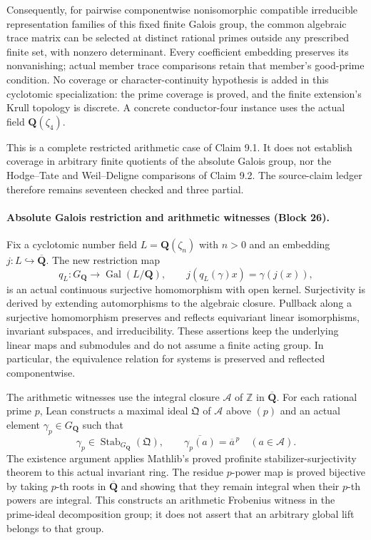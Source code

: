 \documentclass[11pt]{article}
\theoremstyle{definition}
\theoremstyle{remark}
\newcommand{\Q}{\mathbf Q}
\begin{document}
Consequently, for pairwise componentwise nonisomorphic compatible irreducible
representation families of this fixed finite Galois group, the common algebraic
trace matrix can be selected at distinct rational primes outside any prescribed
finite set, with nonzero determinant. Every coefficient embedding preserves its
nonvanishing; actual member trace comparisons retain that member's good-prime
condition. No coverage or character-continuity hypothesis is added in this
cyclotomic specialization: the prime coverage is proved, and the finite
extension's Krull topology is discrete. A concrete conductor-four instance uses
the actual field $\Q(\zeta_4)$.

This is a complete restricted arithmetic case of Claim 9.1. It does not establish
coverage in arbitrary finite quotients of the absolute Galois group, nor the
Hodge--Tate and Weil--Deligne comparisons of Claim 9.2. The source-claim ledger
therefore remains seventeen checked and three partial.

\paragraph{Absolute Galois restriction and arithmetic witnesses (Block 26).}
Fix a cyclotomic number field $L=\Q(\zeta_n)$ with $n>0$ and an embedding
$j:L\hookrightarrow\overline{\Q}$. The new restriction map
\[
 q_L:G_{\Q}\longrightarrow\operatorname{Gal}(L/\Q),\qquad
 j(q_L(\gamma)x)=\gamma(j(x)),
\]
is an actual continuous surjective homomorphism with open kernel. Surjectivity
is derived by extending automorphisms to the algebraic closure. Pullback along
a surjective homomorphism preserves and reflects equivariant linear
isomorphisms, invariant subspaces, and irreducibility. These assertions keep
the underlying linear maps and submodules and do not assume a finite acting
group. In particular, the equivalence relation for systems is preserved and
reflected componentwise.

The arithmetic witnesses use the integral closure
$\mathcal A$ of $\mathbb Z$ in $\overline{\Q}$. For each rational prime $p$,
Lean constructs a maximal ideal $\mathfrak Q$ of $\mathcal A$ above $(p)$ and
an actual element $\gamma_p\in G_{\Q}$ such that
\[
 \gamma_p\in\operatorname{Stab}_{G_{\Q}}(\mathfrak Q),\qquad
 \overline{\gamma_p(a)}=\overline a^{\,p}
 \quad(a\in\mathcal A).
\]
The existence argument applies Mathlib's proved profinite stabilizer-surjectivity
theorem to this actual invariant ring. The residue $p$-power map is proved
bijective by taking $p$-th roots in $\overline{\Q}$ and showing that they
remain integral when their $p$-th powers are integral. This constructs an
arithmetic Frobenius witness in the prime-ideal decomposition group; it does
not assert that an arbitrary global lift belongs to that group.
\end{document}
